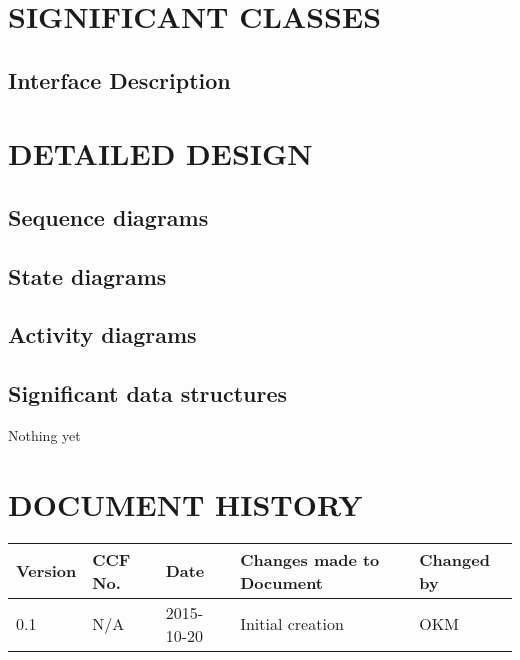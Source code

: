 \documentclass{project}
\begin{document}
\section{SIGNIFICANT CLASSES}
\subsection{Interface Description}

\section{DETAILED DESIGN}
\subsection{Sequence diagrams}
\subsection{State diagrams}
\subsection{Activity diagrams}
\subsection{Significant data structures}

\clearpage
{}
\begin{thebibliography}{5}
 Nothing yet
\end{thebibliography}
\clearpage

\section*{DOCUMENT HISTORY}
\begin{tabular}{|l | l | l | l | l |}
\hline
Version & CCF No. & Date & Changes made to Document & Changed by \\
\hline
0.1 & N/A & 2015-10-20 & Initial creation & OKM \\
\hline
\end{tabular}
\label{thelastpage}
\end{document}

